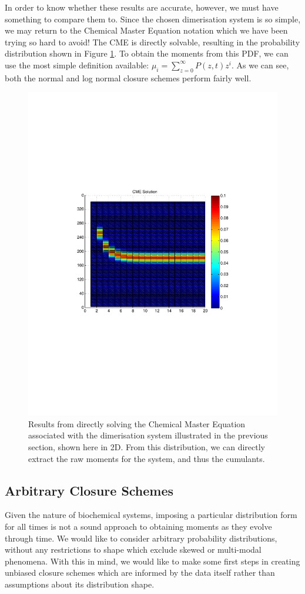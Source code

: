 \documentclass[a4paper,10pt]{article}
\begin{document}
In order to know whether these results are accurate, however, we must have something to compare them to. Since the chosen dimerisation system is so simple, we may return to the Chemical Master Equation notation which we have been trying so hard to avoid! The CME is directly solvable, resulting in the probability distribution shown in Figure \ref{true}. To obtain the moments from this PDF, we can use the most simple definition available: $\mu_i=\sum_{z=0}^\infty P(z,t) z^i$. As we can see, both the normal and log normal closure schemes perform fairly well.
\begin{figure}[h!]
 \includegraphics[width=\textwidth,height=\textwidth]{cme_solution.pdf}
 \caption{Results from directly solving the Chemical Master Equation associated with the dimerisation system illustrated in the previous section, shown here in 2D. From this distribution, we can directly extract the raw moments for the system, and thus the cumulants.}
 \label{true}
\end{figure}

\subsection{Arbitrary Closure Schemes}
Given the nature of biochemical systems, imposing a particular distribution form for all times is not a sound approach to obtaining moments as they evolve through time. We would like to consider arbitrary probability distributions, without any restrictions to shape which exclude skewed or multi-modal phenomena. With this in mind, we would like to make some first steps in creating unbiased closure schemes which are informed by the data itself rather than assumptions about its distribution shape. \\
\end{document}
